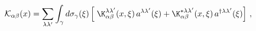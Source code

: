 \begin{equation}\label{eq:field}
{\cal K}_{\alpha\beta}(x)= \sum_{\lambda \lambda'}\int_{\gamma}
d\sigma_{\gamma}(\xi) \left[ \;{\cal
\K}_{\alpha\beta}^{\lambda\lambda'}(x,\xi)\,
a^{\lambda\lambda'}(\xi) +{\cal
\K}_{\alpha\beta}^{*\lambda\lambda'} (x,\xi)\,
a^{\dagger\lambda\lambda'}(\xi)\right]\,,
\end{equation}

